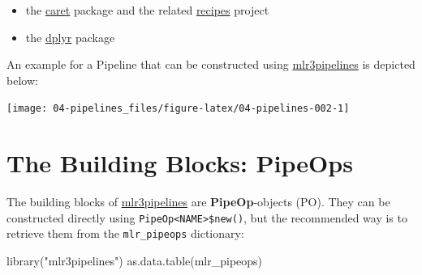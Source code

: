 \documentclass[
]{scrbook}
\newenvironment{Shaded}{\begin{snugshade}}{\end{snugshade}}
\newcommand{\FunctionTok}[1]{\textcolor[rgb]{0.00,0.00,0.00}{#1}}
\newcommand{\NormalTok}[1]{#1}
\newcommand{\StringTok}[1]{\textcolor[rgb]{0.31,0.60,0.02}{#1}}
\providecommand{\tightlist}{%
  \setlength{\itemsep}{0pt}\setlength{\parskip}{0pt}}
\renewenvironment{Shaded} {\begin{snugshade}\small} {\end{snugshade}}
\begin{document}
\begin{itemize}
\tightlist
\item
  the \href{https://cran.r-project.org/package=caret}{caret} package and the related \href{https://cran.r-project.org/package=recipes}{recipes} project
\item
  the \href{https://cran.r-project.org/package=dplyr}{dplyr} package
\end{itemize}

An example for a Pipeline that can be constructed using \href{https://mlr3pipelines.mlr-org.com}{mlr3pipelines} is depicted below:

\begin{center}\texttt{[image: 04-pipelines\_files/figure-latex/04-pipelines-002-1]} \end{center}

\hypertarget{pipe-pipeops}{%
\section{The Building Blocks: PipeOps}\label{pipe-pipeops}}

The building blocks of \href{https://mlr3pipelines.mlr-org.com}{mlr3pipelines} are \textbf{PipeOp}-objects (PO).
They can be constructed directly using \texttt{PipeOp\textless{}NAME\textgreater{}\$new()}, but the recommended way is to retrieve them from the \texttt{mlr\_pipeops} dictionary:

\begin{Shaded}
\begin{Highlighting}[]
\FunctionTok{library}\NormalTok{(}\StringTok{"mlr3pipelines"}\NormalTok{)}
\FunctionTok{as.data.table}\NormalTok{(mlr\_pipeops)}
\end{Highlighting}
\end{Shaded}
\end{document}
